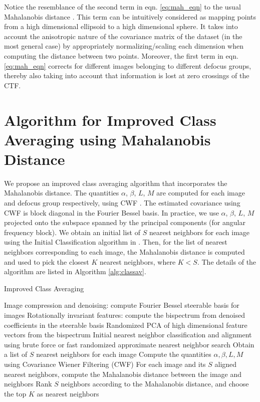 \documentclass{article}
\begin{document}
Notice the resemblance of the second term in eqn. \ref{eq:mah_eqn} to the usual Mahalanobis distance \cite{mah}. This term can be intuitively considered as mapping points from a high dimensional ellipsoid to a high dimensional sphere. It takes into account the anisotropic nature of the covariance matrix of the dataset (in the most general case) by appropriately normalizing/scaling each dimension when computing the distance between two points. Moreover, the first term in eqn. \ref{eq:mah_eqn} corrects for different images belonging to different defocus groups, thereby also taking into account that information is lost at zero crossings of the CTF.

\section{Algorithm for Improved Class Averaging using Mahalanobis Distance}

We propose an improved class averaging algorithm that incorporates the Mahalanobis distance. The quantities $\alpha$, $\beta$, $L$, $M$ are computed for each image and defocus group respectively, using CWF \cite{cwf}. The estimated covariance using CWF is block diagonal in the Fourier Bessel basis. In practice, we use $\alpha$, $\beta$, $L$, $M$ projected onto the subspace spanned by the principal components (for angular frequency block). We obtain an initial list of $S$ nearest neighbors for each image using the Initial Classification algorithm in \cite{zhao1}. Then, for the list of nearest neighbors corresponding to each image, the Mahalanobis distance is computed and used to pick the closest $K$ nearest neighbors, where $K<S$. The details of the algorithm are listed in Algorithm \ref{alg:classav}. 

\begin{algorithm}
\caption{Improved Class Averaging }
\label{alg:classav}
\begin{algorithmic}[1]
\State Image compression and denoising: compute Fourier Bessel steerable basis for images \cite{ffbspca}
\State Rotationally invariant features: compute the bispectrum from denoised coefficients in the steerable basis
\State Randomized PCA\cite{rokhlin} of high dimensional feature vectors from the bispectrum
\State Initial nearest neighbor classification and alignment using brute force or fast randomized approximate nearest neighbor search \cite{fastnn}
\State Obtain a list of $S$ nearest neighbors for each image
\EndProcedure
{}
\State Compute the quantities $\alpha, \beta, L, M$ using Covariance Wiener Filtering (CWF) \cite{cwf}
\State For each image and its $S$ aligned nearest neighbors, compute the Mahalanobis distance between the image and neighbors
\State Rank $S$ neighbors according to the Mahalanobis distance, and choose the top $K$ as nearest neighbors
\EndProcedure
{}
\EndProcedure
\end{algorithmic}
\end{algorithm}
\end{document}
